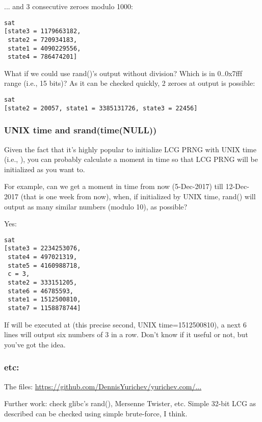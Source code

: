 ... and 3 consecutive zeroes modulo 1000:



\begin{lstlisting}
sat
[state3 = 1179663182,
 state2 = 720934183,
 state1 = 4090229556,
 state4 = 786474201]
\end{lstlisting}

What if we could use rand()'s output without division? Which is in 0..0x7fff range (i.e., 15 bits)?
As it can be checked quickly, 2 zeroes at output is possible:



\begin{lstlisting}
sat
[state2 = 20057, state1 = 3385131726, state3 = 22456]
\end{lstlisting}

\subsubsection{UNIX time and srand(time(NULL))}

Given the fact that it's highly popular to initialize LCG PRNG with UNIX time (i.e., ), you can probably calculate a moment in time so that LCG PRNG will be initialized as you want to.

For example, can we get a moment in time from now (5-Dec-2017) till 12-Dec-2017 (that is one week from now), when, if initialized by UNIX time, rand() will output as many similar numbers (modulo 10), as possible?



Yes:

\begin{lstlisting}
sat
[state3 = 2234253076,
 state4 = 497021319,
 state5 = 4160988718,
 c = 3,
 state2 = 333151205,
 state6 = 46785593,
 state1 = 1512500810,
 state7 = 1158878744]
\end{lstlisting}

If  will be executed at  (this precise second, UNIX time=1512500810), a next 6  lines will output six numbers of 3 in a row.
Don't know if it useful or not, but you've got the idea.

\subsubsection{etc:}

The files: \url{https://github.com/DennisYurichev/yurichev.com/...}

Further work: check glibc's rand(), Mersenne Twister, etc. Simple 32-bit LCG as described can be checked using simple brute-force, I think.

